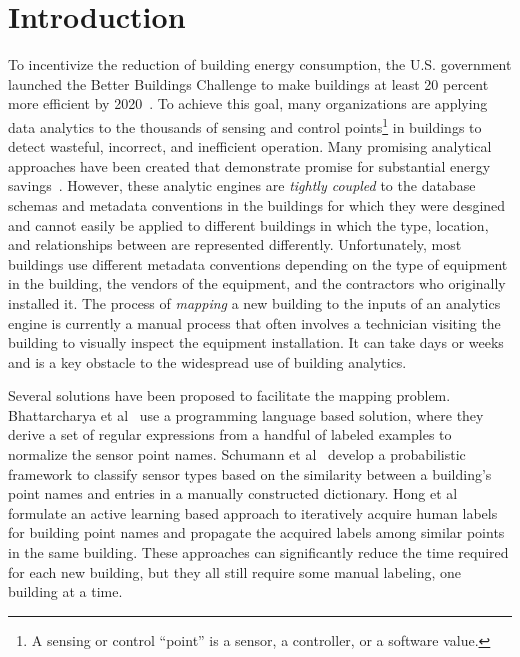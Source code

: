 \section{Introduction}

To incentivize the reduction of building energy consumption, the U.S. government
launched the Better Buildings Challenge to make buildings at least 20 percent
more efficient by 2020~\cite{doe2013better}. To achieve this goal, many
organizations are applying data analytics to the thousands of sensing and
control points\footnote{A sensing or control ``point'' is a sensor, a
  controller, or a software value.} in buildings to detect wasteful, incorrect,
and inefficient operation.  Many promising analytical approaches have been
created that demonstrate promise for substantial energy savings~\cite{find}.
However, these analytic engines are \emph{tightly coupled} to the database
schemas and metadata conventions in the buildings for which they were desgined
and cannot easily be applied to different buildings in which the type, location,
and relationships between are represented differently. Unfortunately, most
buildings use different metadata conventions depending on the type of equipment
in the building, the vendors of the equipment, and the contractors who
originally installed it. The process of {\em mapping} a new building to the
inputs of an analytics engine is currently a manual process that often involves
a technician visiting the building to visually inspect the equipment
installation. It can take days or weeks and is a key obstacle to the widespread
use of building analytics.

Several solutions have been proposed to facilitate the mapping problem.
Bhattarcharya et al~\cite{arka} use a programming language based solution,
where they derive a set of regular expressions from a handful of labeled examples
to normalize the sensor point names.
Schumann et al~\cite{ibm} develop a probabilistic framework to classify sensor types
based on the similarity between a building's point names and entries in a manually constructed dictionary.
Hong et al~\cite{cikm} formulate an active learning based approach to
iteratively acquire human labels for building point names and propagate the
acquired labels among similar points in the same building.  These approaches can
significantly reduce the time required for each new building, but they all still
require some manual labeling, one building at a time.

